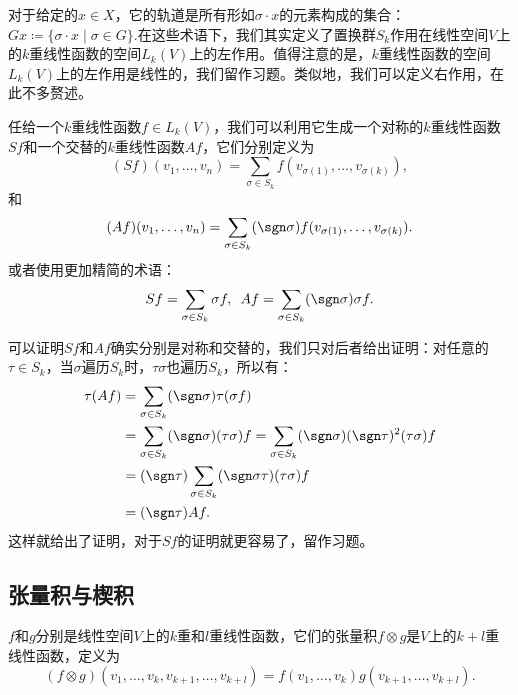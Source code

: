     对于给定的\(x\in X\)，它的{\heiti 轨道}是所有形如\(\sigma\cdot x\)的元素构成的集合：\(Gx\coloneqq\{\sigma\cdot x\mid\sigma\in G\}\).在这些术语下，我们其实定义了置换群\(S_k\)作用在线性空间\(V\)上的\(k\)重线性函数的空间\(L_k(V)\)上的左作用。值得注意的是，\enspace\(k\)重线性函数的空间\(L_k(V)\)上的左作用是线性的，我们留作习题。类似地，我们可以定义{\heiti 右作用}，在此不多赘述。

    任给一个\(k\)重线性函数\(f\in L_k(V)\)，我们可以利用它生成一个对称的\(k\)重线性函数\(Sf\)和一个交替的\(k\)重线性函数\(Af\)，它们分别定义为\[(Sf)(v_1,\dots,v_n) =\sum_{\sigma\in S_k}f(v_{\sigma(1)},\dots,v_{\sigma(k)}),\]和\[(Af)(v_1,\dots,v_n) = \sum_{\sigma\in S_k}(\sgn\sigma)f(v_{\sigma(1)},\dots,v_{\sigma(k)}).\] 
    或者使用更加精简的术语：\[Sf = \sum_{\sigma\in S_k}\sigma f,\enspace Af = \sum_{\sigma\in S_k}(\sgn\sigma)\sigma f.\]

    可以证明\(Sf\)和\(Af\)确实分别是对称和交替的，我们只对后者给出证明：对任意的\(\tau\in S_k\)，当\(\sigma\)遍历\(S_k\)时，\(\tau\sigma\)也遍历\(S_k\)，所以有：
    \begin{equation*}
        \begin{split}
            \tau(Af) &= \sum_{\sigma\in S_k}(\sgn\sigma)\tau(\sigma f)\\
            &= \sum_{\sigma\in S_k}(\sgn\sigma)(\tau\sigma)f = \sum_{\sigma\in S_k}(\sgn\sigma)(\sgn\tau)^2(\tau\sigma)f\\
            &= (\sgn\tau)\sum_{\sigma\in S_k}(\sgn\sigma\tau)(\tau\sigma)f\\
            &= (\sgn\tau)Af.
        \end{split}
    \end{equation*}
    这样就给出了证明，对于\(Sf\)的证明就更容易了，留作习题。

    \subsection{张量积与楔积}
    
    \begin{definition}[张量积]
        \(f\)和\(g\)分别是线性空间\(V\)上的\(k\)重和\(l\)重线性函数，它们的{\heiti 张量积}\(f\otimes g\)是\(V\)上的\(k+l\)重线性函数，定义为\[(f\otimes g)(v_1,\dots,v_k,v_{k+1},\dots,v_{k+l})=f(v_1,\dots,v_k)g(v_{k+1},\dots,v_{k+l}).\]
    \end{definition}

